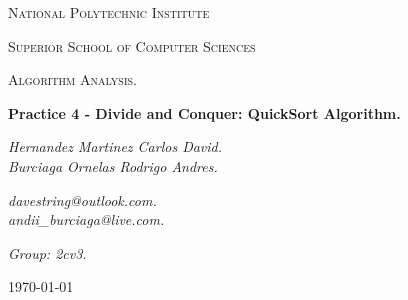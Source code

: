 \begin{titlepage}
	\centering
	{ \huge \scshape National Polytechnic Institute\par}
	{ \Large \scshape  Superior School of Computer Sciences\par }
	\vspace{1cm}
	{\scshape\Large Algorithm Analysis.\par}
	\vspace{1.5cm}
	{\Huge\bfseries Practice 4 - Divide and Conquer: QuickSort Algorithm.\par}
	\vspace{2cm}
	{\Large\itshape Hernandez Martinez Carlos David. \\ Burciaga Ornelas Rodrigo Andres.\par} \hfill \break
	{\Large\itshape davestring@outlook.com. \\ andii\_burciaga@live.com.\par} \hfill \break
	{\Large\itshape Group: 2cv3. \par}
	\vfill
	{\large \today\par} 
	\vfill
\end{titlepage}

\renewcommand\lstlistingname{Quelltext} 



\tableofcontents 
{}
\pagebreak